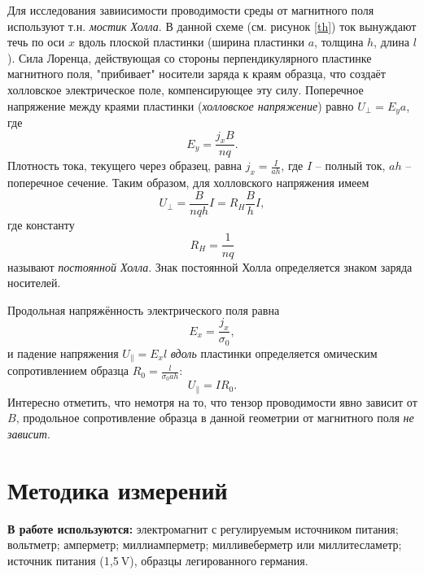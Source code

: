 \documentclass[12pt, a4paper]{article}
\newcommand{\V}{~\mathrm{V}}
\begin{document}
Для исследования завиисимости проводимости среды от магнитного поля используют т.н. \textit{мостик Холла}. В данной схеме (см. рисунок \ref{th}) ток вынуждают течь по оси $x$ вдоль плоской пластинки (ширина пластинки $a$, толщина $h$, длина $l$). Сила Лоренца, действующая со стороны перпендикулярного пластинке магнитного поля, "прибивает" носители заряда к краям образца, что создаёт холловское электрическое поле, компенсирующее эту силу. Поперечное напряжение между краями пластинки (\textit{холловское напряжение}) равно $U_{\perp}=E_ya$, где\[E_y=\frac{j_xB}{nq}.\]Плотность тока, текущего через образец, равна $j_x=\frac{I}{ah}$, где $I$ -- полный ток, $ah$ -- поперечное сечение. Таким образом, для холловского напряжения имеем
\begin{equation}U_{\perp}=\frac{B}{nqh}I=R_H\frac{B}{h}I,\label{eq:uperp}
\end{equation}
где константу
\begin{equation}R_H=\frac{1}{nq}\label{eq:r_hall}
\end{equation}
называют \textit{постоянной Холла}. Знак постоянной Холла определяется знаком заряда носителей.

Продольная напряжённость электрического поля равна
\begin{equation}
  E_x=\frac{j_x}{\sigma_0},
  \label{eq:ey}
\end{equation}
и падение напряжения $U_{\parallel}=E_xl$ \textit{вдоль} пластинки определяется омическим сопротивлением образца $R_0=\frac{l}{\sigma_0ah}$:\[U_{\parallel}=IR_0.\]Интересно отметить, что немотря на то, что тензор проводимости явно зависит от $B$, продольное сопротивление образца в данной геометрии от магнитного поля \textit{не зависит}.


\section{Методика измерений}
\textbf{В работе используются:}  электромагнит с регулируемым источником пи­тания; вольтметр; амперметр; миллиамперметр; милливеберметр или мил­литесламетр; источник питания (1,5$\V$), образцы легированного германия.
\end{document}
